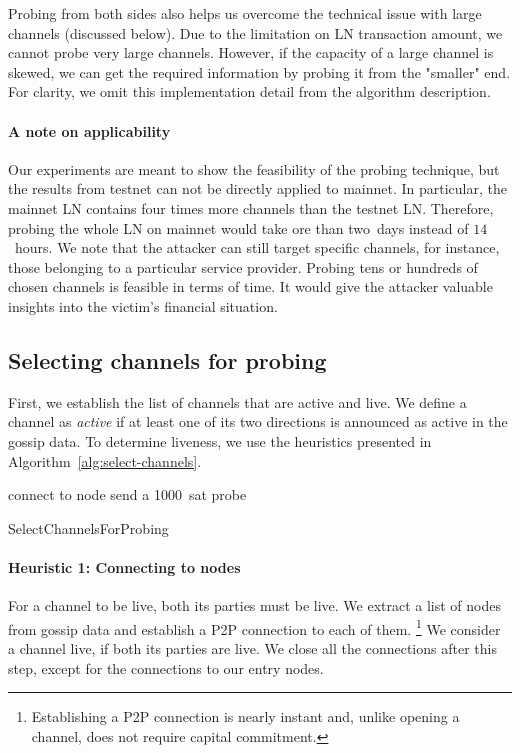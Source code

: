 Probing from both sides also helps us overcome the technical issue with large channels (discussed below).
Due to the limitation on LN transaction amount, we cannot probe very large channels.
However, if the capacity of a large channel is skewed, we can get the required information by probing it from the "smaller" end.
For clarity, we omit this implementation detail from the algorithm description.

\paragraph{A note on applicability}
Our experiments are meant to show the feasibility of the probing technique, but the results from testnet can not be directly applied to mainnet.
In particular, the mainnet LN contains four times more channels than the testnet LN.
Therefore, probing the whole LN on mainnet would take ore than two~days instead of $14$~hours.
We note that the attacker can still target specific channels, for instance, those belonging to a particular service provider.
Probing tens or hundreds of chosen channels is feasible in terms of time.
It would give the attacker valuable insights into the victim's financial situation.


\subsection{Selecting channels for probing}

First, we establish the list of channels that are active and live.
We define a channel as \textit{active} if at least one of its two directions is announced as active in the gossip data.
To determine liveness, we use the heuristics presented in Algorithm~\ref{alg:select-channels}.

\begin{algorithm}
	 {
		connect to node\;
	}
	 {
		send a 1000~sat probe\;
	}
	\caption{SelectChannelsForProbing}
	\label{alg:select-channels}
\end{algorithm}

\paragraph{Heuristic 1: Connecting to nodes}
For a channel to be live, both its parties must be live.
We extract a list of nodes from gossip data and establish a P2P connection to each of them.
\footnote{Establishing a P2P connection is nearly instant and, unlike opening a channel, does not require capital commitment.}
We consider a channel live, if both its parties are live.
We close all the connections after this step, except for the connections to our entry nodes.

